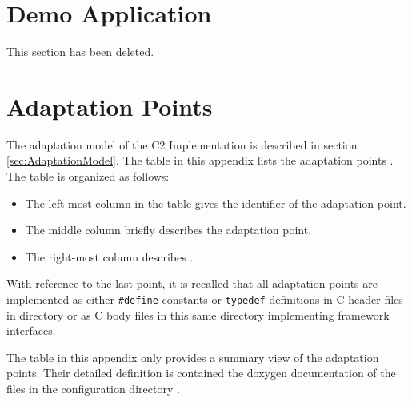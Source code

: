 \documentclass{pnp_article}
\begin{document}
\section{Demo Application}\label{sec:DemoApp}
This section has been deleted.



\appendix
\section{Adaptation Points}\label{sec:AdaptationPoints}
The adaptation model of the C2 Implementation is described in section \ref{sec:AdaptationModel}. The table in this appendix lists the adaptation points . The table is organized as follows:

\begin{itemize}
\item The left-most column in the table gives the identifier of the adaptation point. 
\item The middle column briefly describes the adaptation point.
\item The right-most column describes .
\end{itemize}

With reference to the last point, it is recalled that all adaptation points are implemented as either \texttt{\#define} constants or \texttt{typedef} definitions in C header files in directory  or as C body files in this same directory implementing framework interfaces.

The table in this appendix only provides a summary view of the adaptation points. Their detailed definition is contained  the doxygen documentation of the files in the configuration directory . 


\begin{landscape}


\end{landscape}

\end{document}
